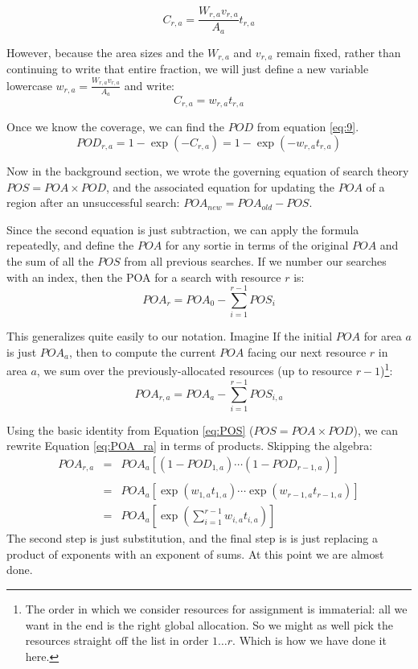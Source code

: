 \begin{equation}
  \label{eq:C_ra}
  C_{r,a} = \frac{W_{r,a} v_{r,a}}{A_a} t_{r,a}
\end{equation}

However, because the area sizes and the $W_{r,a}$ and $v_{r,a}$ remain fixed,
rather than continuing to write that entire fraction, we will
just define a new variable lowercase $w_{r,a} = \frac{W_{r,a} v_{r,a}}{A_a}$ and write:
\begin{equation}
  \label{eq:C_ra2}
  C_{r,a} = w_{r,a} t_{r,a}
\end{equation}

Once we know the coverage, we can find the $POD$ from equation \ref{eq:9}. 
\begin{equation}
  \label{eq:POD_ra}
  POD_{r,a} = 1 - \exp(-C_{r,a}) = 1 - \exp(-w_{r,a} t_{r,a})
\end{equation}

Now in the background section, we wrote the governing equation of
search theory $POS = POA \times POD$, and the associated equation for
updating the $POA$ of a region after an unsuccessful search:
$POA_{new} = POA_{old} - POS$. 

Since the second equation is just subtraction, we can apply the
formula repeatedly, and define the $POA$ for any sortie in terms of
the original $POA$ and the sum of all the $POS$ from all previous
searches. If we number our searches with an index, then the POA for
a search with resource $r$ is:
\begin{equation}
  \label{eq:POA2'}
  POA_{r} = POA_0 - \sum_{i=1}^{r-1} POS_i
\end{equation}


This generalizes quite easily to our notation. Imagine If the initial $POA$
for area $a$ is just $POA_a$, then to compute the current $POA$ facing
our next resource $r$ in area $a$, we sum over the
previously-allocated resources (up to resource $r-1$)\footnote{
  The order in which we consider resources for assignment is
  immaterial: all we want in the end is the right global allocation.
  So we might as well pick the resources straight off the list in
  order $1 \ldots r$. Which is how we have done it here.}:
\begin{equation}
  \label{eq:POA_ra}
  POA_{r,a} = POA_a - \sum_{i=1}^{r-1}POS_{i,a}
\end{equation}

Using the basic identity from Equation \ref{eq:POS} ($POS =
POA \times POD$), we can
rewrite Equation \ref{eq:POA_ra} in terms of products. Skipping the algebra:
\begin{eqnarray}
  \label{eq:15}
  \nonumber POA_{r,a} &=& POA_a \left[(1-POD_{1,a})\cdots(1-POD_{r-1,a})\right]\\
                   & & \\
  \nonumber &=& POA_a \left[\exp(w_{1,a}t_{1,a}) \cdots \exp(w_{r-1,a}t_{r-1,a})\right]\\
  \nonumber &=& POA_a \left[\exp\left(\sum_{i=1}^{r-1}w_{i,a}t_{i,a}\right)\right]
\end{eqnarray}
The second step is just substitution, and the final step is is just
replacing a product of exponents with an exponent of sums. At this point we are almost done.

